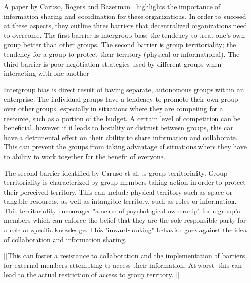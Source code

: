 A paper by Caruso, Rogers and Bazerman~\cite{caruso2008boundaries} highlights the importance of information sharing and coordination for these organizations. In order to succeed at these aspects, they outline three barriers that decentralized organizations need to overcome. The first barrier is intergroup bias; the tendency to treat one's own group better than other groups. The second barrier is group territoriality; the tendency for a group to protect their territory (physical or informational). The third barrier is poor negotiation strategies used by different groups when interacting with one another. 

Intergroup bias is direct result of having separate, autonomous groups within an enterprise. The individual groups have a tendency to promote their own group over other groups, especially in situations where they are competing for a resource, such as a portion of the budget. A certain level of competition can be beneficial, however if it leads to hostility or distrust between groups, this can have a detrimental effect on their ability to share information and collaborate. This can prevent the groups from taking advantage of situations where they have to ability to work together for the benefit of everyone. 

The second barrier identified by Caruso et al. is group territoriality. Group territoriality is characterized by group members taking action in order to protect their perceived territory. This can include physical territory such as space or tangible resources, as well as intangible territory, such as roles or information. This territoriality encourages "a sense of psychological ownership" for a group's members which can enforce the belief that they are the sole responsible party for a role or specific knowledge. This "inward-looking" behavior goes against the idea of collaboration and information sharing. 





[[This can foster a resistance to collaboration and the implementation of barriers for external members attempting to access their information. At worst, this can lead to the actual restriction of access to group territory. ]]


